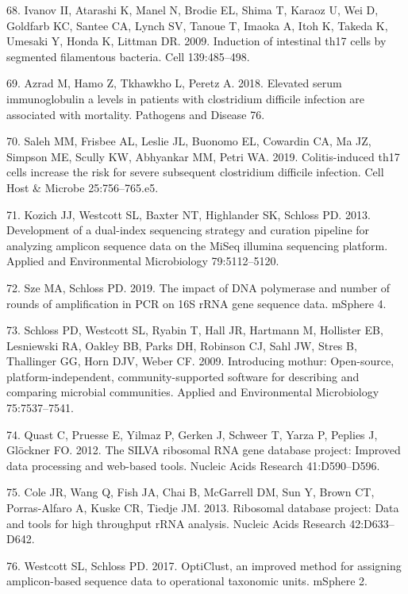\documentclass[11pt,]{article}
\begin{document}
\hypertarget{ref-Ivanov2009}{}
68. Ivanov II, Atarashi K, Manel N, Brodie EL, Shima T, Karaoz U, Wei D,
Goldfarb KC, Santee CA, Lynch SV, Tanoue T, Imaoka A, Itoh K, Takeda K,
Umesaki Y, Honda K, Littman DR. 2009. Induction of intestinal th17 cells
by segmented filamentous bacteria. Cell 139:485--498.

\hypertarget{ref-Azrad2018}{}
69. Azrad M, Hamo Z, Tkhawkho L, Peretz A. 2018. Elevated serum
immunoglobulin a levels in patients with clostridium difficile infection
are associated with mortality. Pathogens and Disease 76.

\hypertarget{ref-Saleh2019}{}
70. Saleh MM, Frisbee AL, Leslie JL, Buonomo EL, Cowardin CA, Ma JZ,
Simpson ME, Scully KW, Abhyankar MM, Petri WA. 2019. Colitis-induced
th17 cells increase the risk for severe subsequent clostridium difficile
infection. Cell Host \& Microbe 25:756--765.e5.

\hypertarget{ref-Kozich2013}{}
71. Kozich JJ, Westcott SL, Baxter NT, Highlander SK, Schloss PD. 2013.
Development of a dual-index sequencing strategy and curation pipeline
for analyzing amplicon sequence data on the MiSeq illumina sequencing
platform. Applied and Environmental Microbiology 79:5112--5120.

\hypertarget{ref-Sze2019}{}
72. Sze MA, Schloss PD. 2019. The impact of DNA polymerase and number of
rounds of amplification in PCR on 16S rRNA gene sequence data. mSphere
4.

\hypertarget{ref-Schloss2009}{}
73. Schloss PD, Westcott SL, Ryabin T, Hall JR, Hartmann M, Hollister
EB, Lesniewski RA, Oakley BB, Parks DH, Robinson CJ, Sahl JW, Stres B,
Thallinger GG, Horn DJV, Weber CF. 2009. Introducing mothur:
Open-source, platform-independent, community-supported software for
describing and comparing microbial communities. Applied and
Environmental Microbiology 75:7537--7541.

\hypertarget{ref-Quast2012}{}
74. Quast C, Pruesse E, Yilmaz P, Gerken J, Schweer T, Yarza P, Peplies
J, Glöckner FO. 2012. The SILVA ribosomal RNA gene database project:
Improved data processing and web-based tools. Nucleic Acids Research
41:D590--D596.

\hypertarget{ref-Cole2013}{}
75. Cole JR, Wang Q, Fish JA, Chai B, McGarrell DM, Sun Y, Brown CT,
Porras-Alfaro A, Kuske CR, Tiedje JM. 2013. Ribosomal database project:
Data and tools for high throughput rRNA analysis. Nucleic Acids Research
42:D633--D642.

\hypertarget{ref-Westcott2017}{}
76. Westcott SL, Schloss PD. 2017. OptiClust, an improved method for
assigning amplicon-based sequence data to operational taxonomic units.
mSphere 2.
\end{document}
